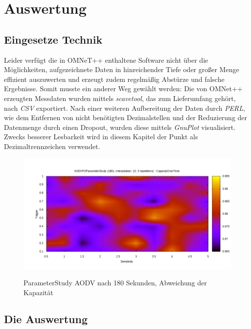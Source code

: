 
\chapter{Auswertung}
\label{chapter:auswertung}

\section{Eingesetze Technik}
\label{chapter:auswertung:technik}

Leider verfügt die in OMNeT++ enthaltene Software nicht über die Möglichkeiten, aufgezeichnete Daten in hinreichender Tiefe oder großer Menge effizient auszuwerten und erzeugt zudem regelmäßig Abstürze und falsche Ergebnisse. Somit musste ein anderer Weg gewählt werden: Die von OMNet++ erzeugten Messdaten wurden mittels \textit{scavetool}, das zum Lieferumfang gehört, nach \textit{CSV} exportiert. Nach einer weiteren Aufbereitung der Daten durch \textit{PERL}, wie dem Entfernen von nicht benötigten Dezimalstellen und der Reduzierung der Datenmenge durch einen Dropout, wurden diese mittels \textit{GnuPlot} visualisiert. Zwecks besserer Lesbarkeit wird in diesem Kapitel der Punkt als Dezimaltrennzeichen verwendet.

\begin{figure}
  \centering
  \includegraphics[scale=0.55]{bilder/aps1.png} \\
  \caption{ParameterStudy AODV nach 180 Sekunden, Abweichung der Kapazität}
  \label{image:omnet:aodv:one}
\end{figure}

\section{Die Auswertung}
\label{chapter:auswertung:versuche}

